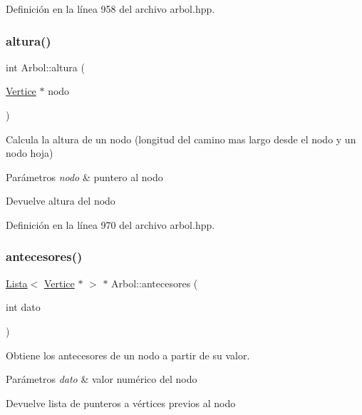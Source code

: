 Definición en la línea 958 del archivo arbol.\+hpp.

\mbox{\label{classArbol_a9f8928b4c72e2d484ef75cf3633c22ce}} 
\subsubsection{\texorpdfstring{altura()}{altura()}\hspace{0.1cm}{\footnotesize\ttfamily [3/3]}}
{\footnotesize\ttfamily int Arbol\+::altura (\begin{DoxyParamCaption}\item[{\hyperlink{classVertice}{Vertice} $\ast$}]{nodo }\end{DoxyParamCaption})}



Calcula la altura de un nodo (longitud del camino mas largo desde el nodo y un nodo hoja) 


\begin{DoxyParams}{Parámetros}
{\em nodo} & puntero al nodo \\
\hline
\end{DoxyParams}
\begin{DoxyReturn}{Devuelve}
altura del nodo 
\end{DoxyReturn}


Definición en la línea 970 del archivo arbol.\+hpp.

\mbox{\label{classArbol_ac7ff5e2f436a1e83e24cbdd0b2cc827b}} 
\subsubsection{\texorpdfstring{antecesores()}{antecesores()}\hspace{0.1cm}{\footnotesize\ttfamily [1/2]}}
{\footnotesize\ttfamily \hyperlink{classLista}{Lista}$<$ \hyperlink{classVertice}{Vertice} $\ast$ $>$ $\ast$ Arbol\+::antecesores (\begin{DoxyParamCaption}\item[{int}]{dato }\end{DoxyParamCaption})}



Obtiene los antecesores de un nodo a partir de su valor. 


\begin{DoxyParams}{Parámetros}
{\em dato} & valor numérico del nodo \\
\hline
\end{DoxyParams}
\begin{DoxyReturn}{Devuelve}
lista de punteros a vértices previos al nodo 
\end{DoxyReturn}


